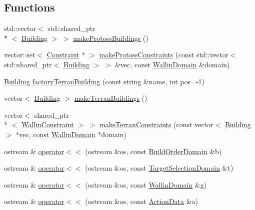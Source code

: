 \subsection*{Functions}
\begin{DoxyCompactItemize}
\item 
std\-::vector$<$ std\-::shared\-\_\-ptr\\*
$<$ \hyperlink{classghost_1_1Building}{Building} $>$ $>$ \hyperlink{namespaceghost_af3e32bb59f07ee561580978affe544bd}{make\-Protoss\-Buildings} ()
\item 
vector\-::set$<$ \hyperlink{classghost_1_1Constraint}{Constraint} $\ast$ $>$ \hyperlink{namespaceghost_a876b814af945577733c112c82d0423c3}{make\-Protoss\-Constraints} (const std\-::vector$<$ std\-::shared\-\_\-ptr$<$ \hyperlink{classghost_1_1Building}{Building} $>$ $>$ \&vec, const \hyperlink{classghost_1_1WallinDomain}{Wallin\-Domain} \&domain)
\item 
\hyperlink{classghost_1_1Building}{Building} \hyperlink{namespaceghost_a797dd3167189ccc913156ff624a7ad6a}{factory\-Terran\-Building} (const string \&name, int pos=-\/1)
\item 
vector$<$ \hyperlink{classghost_1_1Building}{Building} $>$ \hyperlink{namespaceghost_ade7cf14b6b46de3b038be9fb6c8afd82}{make\-Terran\-Buildings} ()
\item 
vector$<$ shared\-\_\-ptr\\*
$<$ \hyperlink{classghost_1_1WallinConstraint}{Wallin\-Constraint} $>$ $>$ \hyperlink{namespaceghost_af7fa3891f5f6563a142a99d3ab6b604b}{make\-Terran\-Constraints} (const vector$<$ \hyperlink{classghost_1_1Building}{Building} $>$ $\ast$vec, const \hyperlink{classghost_1_1WallinDomain}{Wallin\-Domain} $\ast$domain)
\item 
ostream \& \hyperlink{namespaceghost_ab9c6639581eec36ee5c981bdcebaa4d1}{operator$<$$<$} (ostream \&os, const \hyperlink{classghost_1_1BuildOrderDomain}{Build\-Order\-Domain} \&b)
\item 
ostream \& \hyperlink{namespaceghost_a51a65ec59b29a4696886fe8670e1dc49}{operator$<$$<$} (ostream \&os, const \hyperlink{classghost_1_1TargetSelectionDomain}{Target\-Selection\-Domain} \&t)
\item 
ostream \& \hyperlink{namespaceghost_a324a8e116f71d2eee57a356671330cc1}{operator$<$$<$} (ostream \&os, const \hyperlink{classghost_1_1WallinDomain}{Wallin\-Domain} \&g)
\item 
ostream \& \hyperlink{namespaceghost_a71243ab1786edd855cab3c2a604b2028}{operator$<$$<$} (ostream \&os, const \hyperlink{structghost_1_1ActionData}{Action\-Data} \&a)

\end{DoxyCompactItemize}
